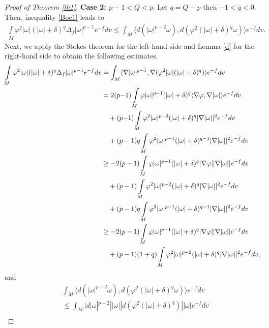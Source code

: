 \documentclass[10pt,a4paper]{amsart}
\numberwithin{equation}{section}
\begin{document}
\begin{proof}[Proof of Theorem \ref{th1}]
	\textbf{Case 2: $p-1<Q<p$}. Let $q=Q-p$ then $-1<q<0$. Then, inequality \eqref{Boc1} leads to
	\begin{align}\label{c12}
		\int\limits_M \varphi ^2|\omega |(|\omega|+\delta)^q \Delta_f |\omega |^{p-1} e^{-f} dv \le 
		\int_M \langle d(|\omega|^{p-2}\omega),d(\varphi^2 (|\omega|+\delta)^q\omega) \rangle  e^{-f}dv.
	\end{align}
	Next, we apply the Stokes theorem for the left-hand side and Lemma \ref{d} for the right-hand side to obtain the following estimates.
	\begin{align}\label{del2}\nonumber
		\int\limits_M {{\varphi ^2}|\omega |(|\omega|+\delta)^q\Delta_f |\omega |^{p-1}}e^{-f}dv \nonumber
			&=\int_M \langle \nabla |\omega|^{p-1}, \nabla ( \varphi^2 |\omega|(|\omega|+\delta)^q) \rangle e^{-f}dv\\ \nonumber
		&=   2(p{-}1)\int\limits_M {\varphi |\omega |^{p-1} (|\omega|+\delta)^q  \langle \nabla \varphi ,\nabla |\omega | \rangle }e^{-f}dv\\
         &\quad + (p{-}1) \int\limits_M {{\varphi ^2}|\omega|^{p-2} (|\omega|+\delta)^q |\nabla |\omega |{|^2}}e^{-f}dv  \nonumber\\ \nonumber
		&
		\quad+(p-1) q\int\limits_M {{\varphi ^2}|\omega|^{p-1} (|\omega|+\delta)^{q-1} |\nabla |\omega |{|^2}}e^{-f}dv\\\nonumber
		&\ge  -2(p-1)\int\limits_M {\varphi |\omega |^{p-1} (|\omega|+\delta)^q  | \nabla \varphi| |\nabla |\omega | | }e^{-f} dv \\ &\nonumber \quad  +
		(p-1) \int\limits_M {{\varphi ^2}|\omega|^{p-2} (|\omega|+\delta)^q |\nabla |\omega |{|^2}}e^{-f}dv\\ \nonumber
		& \quad
		+(p-1) q\int\limits_M {{\varphi ^2}|\omega|^{p-1} (|\omega|+\delta)^{q-1} |\nabla |\omega |{|^2}}e^{-f}dv\\ 
		&\ge  -2(p-1)\int\limits_M {\varphi |\omega |^{p-1} (|\omega|+\delta)^q  | \nabla \varphi| |\nabla |\omega | | }e^{-f} dv \notag \\ &\quad + 
		(p-1)(1+q) \int\limits_M {{\varphi ^2}|\omega|^{p-2} (|\omega|+\delta)^q |\nabla |\omega |{|^2}}e^{-f}dv,
	\end{align}
	and
	\begin{align}\label{d2}\nonumber
		&\int_M \langle d(|\omega|^{p-2}\omega),d(\varphi^2 (|\omega|+\delta)^q\omega) \rangle e^{-f}dv \\\nonumber
		&\le \int_M |d|\omega|^{p-2}||\omega||d(\varphi^2 (|\omega|+\delta)^q)||\omega|e^{-f}dv\\\nonumber

\end{align}
\end{proof}
\end{document}
